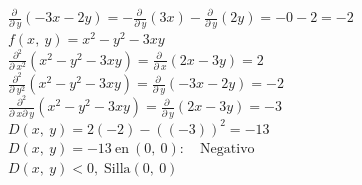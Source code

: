 \documentclass[13pt]{memoir}
\begin{document}
\begin{enumerate}
$\frac{\partial \:}{\partial \:y}\left(-3x-2y\right) =-\frac{\partial \:}{\partial \:y}\left(3x\right)-\frac{\partial \:}{\partial \:y}\left(2y\right) =-0-2 =-2$\\ 

$f\left(x,\:y\right)=x^2-y^2-3xy$\\ 
$\frac{\partial ^2}{\partial \:x^2}\left(x^2-y^2-3xy\right) =\frac{\partial \:}{\partial \:x}\left(2x-3y\right) =2$ \\ 
$\frac{\partial ^2}{\partial \:y^2}\left(x^2-y^2-3xy\right) =\frac{\partial \:}{\partial \:y}\left(-3x-2y\right) =-2$ \\ 
$\frac{\partial ^2}{\partial \:x\partial \:y}\left(x^2-y^2-3xy\right) =\frac{\partial \:}{\partial \:y}\left(2x-3y\right) =-3$\\ 

$D\left(x,\:y\right)=2\left(-2\right)-\left(\left(-3\right)\right)^2 =-13$\\ 

$D\left(x,\:y\right)=-13\mathrm{\:en\:}\left(0,\:0\right):\quad \mathrm{Negativo}$ \\ 
$D\left(x,\:y\right)<0, \; \mathrm{Silla}\left(0,\:0\right)$
 


\end{enumerate}	
\end{document}
